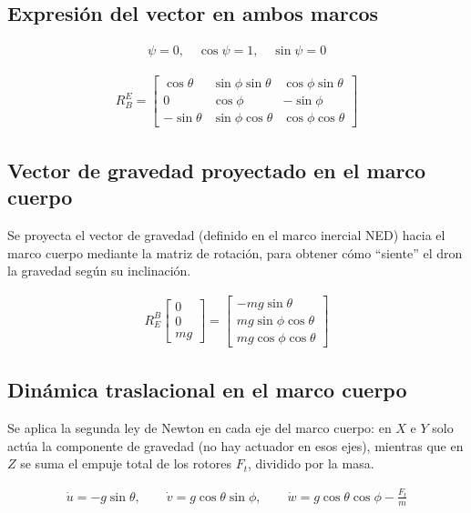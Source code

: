 \documentclass[11pt,a4paper]{article}
\begin{document}
\subsection*{Expresión del vector en ambos marcos}

\begin{align}
\psi = 0, \quad \cos\psi = 1, \quad \sin\psi = 0
\end{align}

\begin{align}
R^E_B = \begin{bmatrix}
\cos\theta & \sin\phi\sin\theta & \cos\phi\sin\theta \\
0 & \cos\phi & -\sin\phi \\
-\sin\theta & \sin\phi\cos\theta & \cos\phi\cos\theta
\end{bmatrix}
\end{align}

\subsection*{Vector de gravedad proyectado en el marco cuerpo}

Se proyecta el vector de gravedad (definido en el marco inercial NED) hacia el marco cuerpo mediante la matriz de rotación, para obtener cómo ``siente'' el dron la gravedad según su inclinación.

\begin{align}
R^B_E \begin{bmatrix} 0 \\ 0 \\ mg \end{bmatrix} =
\begin{bmatrix} -mg\sin\theta \\ mg\sin\phi\cos\theta \\ mg\cos\phi\cos\theta \end{bmatrix}
\end{align}

\subsection*{Dinámica traslacional en el marco cuerpo}

Se aplica la segunda ley de Newton en cada eje del marco cuerpo: en $X$ e $Y$ solo actúa la componente de gravedad (no hay actuador en esos ejes), mientras que en $Z$ se suma el empuje total de los rotores $F_t$, dividido por la masa.

\begin{align}
\dot u = -g\sin\theta, \qquad
\dot v = g\cos\theta\sin\phi, \qquad
\dot w = g\cos\theta\cos\phi - \frac{F_t}{m}
\end{align}
\end{document}
